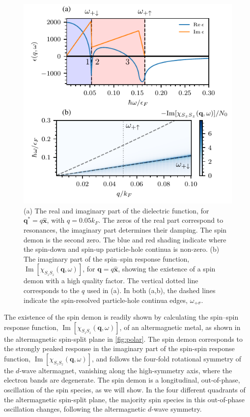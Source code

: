 \documentclass[aps,prl,reprint,twocolumns,superscriptaddress]{revtex4-2}
\DeclareMathOperator{\Imm}{Im}
\newcommand{\xx}{\hat{\bm{x}}}
\newcommand{\kF}{k_{F}}
\begin{document}
	
	\begin{figure}
		\includegraphics{alongx}
		\caption{(a) The real and imaginary part of the dielectric function, for $\bm q^* = q \hat{\bm x}$, with $q=0.05\kF$. The zeros of the real part correspond to resonances, the imaginary part determines their damping. The spin demon is the second zero. The blue and red shading indicate where the spin-down and spin-up particle-hole continua is non-zero. (b)  The imaginary part of the spin–spin response function, $\Imm[\chi_{S_zS_z}(\bm q,\omega)]$, for $\bm q=q\xx$, showing the existence of a spin demon with a high quality factor. The vertical dotted line corresponds to the $q$ used in (a). In both (a,b), the dashed lines indicate the spin-resolved particle-hole continua edges, $\omega_{+\sigma}$.\label{fig:alongx} }
	\end{figure}
	The existence of the spin demon is readily shown by calculating the spin–spin response function, $\Imm[\chi_{S_zS_z}(\bm q,\omega)]$, of an altermagnetic metal, as shown in the altermagnetic spin-split plane in \cref{fig:polar}. The spin demon corresponds to the strongly peaked response in the imaginary part of the spin-spin response function, $\Imm[\chi_{S_zS_z}(\bm q,\omega)]$, and follows the four-fold rotational symmetry of the $d$-wave altermagnet, vanishing along the high-symmetry axis, where the electron bands are degenerate. The spin demon is a longitudinal, out-of-phase, oscillation of the spin species, as we will show. In the four different quadrants of the altermagnetic spin-split plane, the majority spin species in this out-of-phase oscillation changes, following the altermagnetic $d$-wave symmetry. 
	
\end{document}
